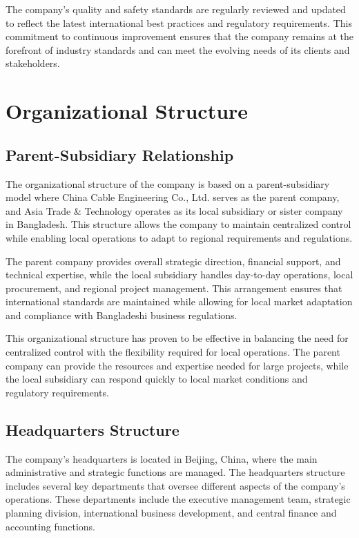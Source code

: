 The company's quality and safety standards are regularly reviewed and updated to reflect the latest international best practices and regulatory requirements. This commitment to continuous improvement ensures that the company remains at the forefront of industry standards and can meet the evolving needs of its clients and stakeholders.

\section{Organizational Structure}

\subsection{Parent-Subsidiary Relationship}
The organizational structure of the company is based on a parent-subsidiary model where China Cable Engineering Co., Ltd. serves as the parent company, and Asia Trade \& Technology operates as its local subsidiary or sister company in Bangladesh. This structure allows the company to maintain centralized control while enabling local operations to adapt to regional requirements and regulations.

The parent company provides overall strategic direction, financial support, and technical expertise, while the local subsidiary handles day-to-day operations, local procurement, and regional project management. This arrangement ensures that international standards are maintained while allowing for local market adaptation and compliance with Bangladeshi business regulations.

This organizational structure has proven to be effective in balancing the need for centralized control with the flexibility required for local operations. The parent company can provide the resources and expertise needed for large projects, while the local subsidiary can respond quickly to local market conditions and regulatory requirements.

\subsection{Headquarters Structure}
The company's headquarters is located in Beijing, China, where the main administrative and strategic functions are managed. The headquarters structure includes several key departments that oversee different aspects of the company's operations. These departments include the executive management team, strategic planning division, international business development, and central finance and accounting functions.


